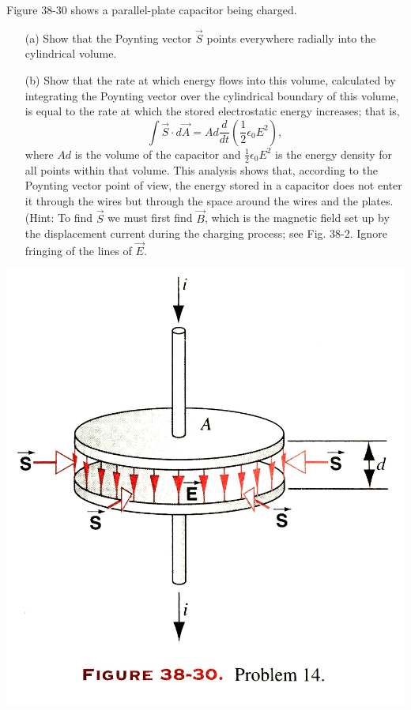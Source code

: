 \documentclass[12pt,letterpaper,boxed,cm]{hmcpset}
\newcommand{\f}[2]{\frac{#1}{#2}}
\newcommand{\pn}[1]{\left( #1 \right)}
\begin{document}
\begin{problem}[38-P14]
Figure 38-30 shows a parallel-plate capacitor being charged.

\begin{enumerate}
	\item[(a)] Show that the Poynting vector $\vec{S}$ points everywhere radially into the cylindrical volume.
	\item[(b)] Show that the rate at which energy flows into this volume, calculated by integrating the Poynting vector over the cylindrical boundary of this volume, is equal to the rate at which the stored electrostatic energy increases; that is,
	\[
		\int \vec{S} \cdot d\vec{A} = Ad\f{d}{dt}\pn{\f{1}{2}\epsilon_0E^2},
	\]
	where $Ad$ is the volume of the capacitor and $\f{1}{2}\epsilon_0E^2$ is the energy density for all points within that volume. This analysis shows that, according to the Poynting vector point of view, the energy stored in a capacitor does not enter it through the wires but through the space around the wires and the plates. (Hint: To find $\vec{S}$ we must first find $\vec{B}$, which is the magnetic field set up by the displacement current during the charging process; see Fig. 38-2. Ignore fringing of the lines of $\vec{E}$.
\end{enumerate}
\begin{center}
	\includegraphics[scale=0.1]{01.jpg}
\end{center}
\end{problem}
\begin{solution}
\end{solution}
\end{document}
